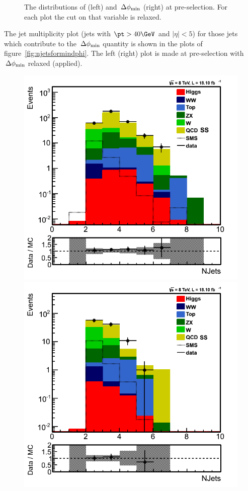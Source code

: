 \begin{figure}[!Hhtb]
\caption{The distributions of \MET (left) and $\,{\Delta\phi_{\rm min}}$ (right) at pre-selection. For each plot the cut on that variable is relaxed.}
\label{fig:met_mindphi}
\end{figure}

The jet multiplicity plot (jets with $\pt>40\GeV$ and $|\eta|<5$) for those jets which contribute to the $\,{\Delta\phi_{\rm min}}$ quantity is shown in the plots of figure~\ref{fig:njetsformindphi}. The left (right) plot is made at pre-selection with $\,{\Delta\phi_{\rm min}}$ relaxed (applied).
\begin{figure}[!Hhtb]
\centering
\includegraphics[angle=0,scale=0.35]{TauTauFigs/NJets_MinDphirelaxed.png}
\includegraphics[angle=0,scale=0.35]{TauTauFigs/NJets.png} \\

\end{figure}
